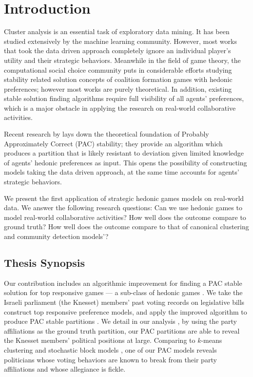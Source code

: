 
\chapter{Introduction}
\vspace{2em}

Cluster analysis is an essential task of exploratory data mining.
It has been studied extensively by the machine learning community.
However, most works that took the data driven approach completely ignore an individual player's utility and their strategic behaviors.
Meanwhile in the field of game theory, the computational social choice community puts in considerable efforts studying stability related solution concepts of coalition formation games with hedonic preferences;
however most works are purely theoretical.
In addition, existing stable solution finding algorithms require full visibility of all agents' preferences, which is a major obstacle in applying the research on real-world collaborative activities.

Recent research by  lays down the theoretical foundation of Probably Approximately Correct (PAC) stability;
they provide an algorithm which produces a partition that is likely resistant to deviation given limited knowledge of agents' hedonic preferences as input.
This opens the possibility of constructing models taking the data driven approach, at the same time accounts for agents' strategic behaviors.

We present the first application of strategic hedonic games models on real-world data.
We answer the following research questions: Can we use hedonic games to model real-world collaborative activities?
How well does the outcome compare to ground truth?
How well does the outcome compare to that of canonical clustering and community detection models'?


\section{Thesis Synopsis}

Our contribution includes an algorithmic improvement for finding a PAC stable solution for top responsive games --- a sub-class of hedonic games
.  We take the Israeli parliament (the Knesset) members' past voting records on legislative bills 
construct top responsive preference models, and apply the improved algorithm to produce PAC stable partitions
.  We detail in our analysis 
, by using the party affiliations as the ground truth partition,
our PAC partitions are able to reveal the Knesset members' political positions at large. 
Comparing to $k$-means clustering and stochastic block models 
, one of our PAC models reveals politicians whose voting behaviors are known to break from their party affiliations and whose allegiance is fickle.

